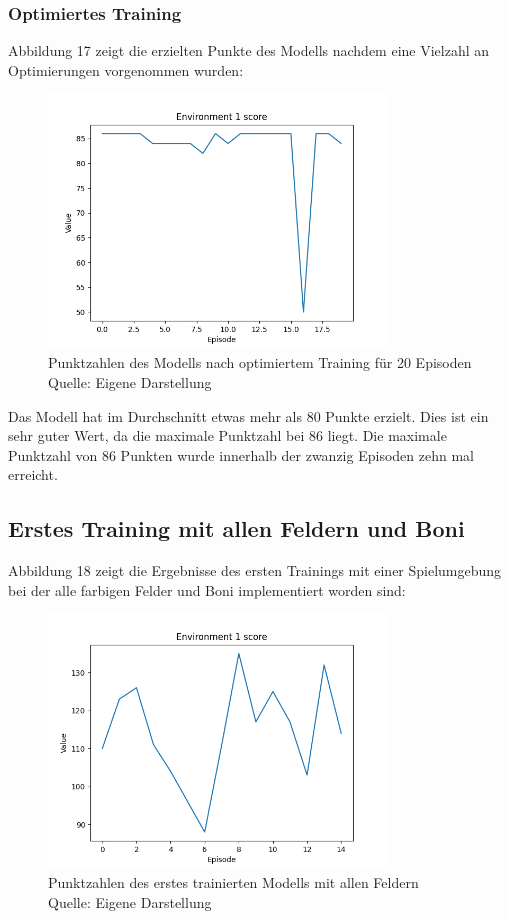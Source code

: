 \subsubsection{Optimiertes Training}
Abbildung 17 zeigt die erzielten Punkte des Modells nachdem eine Vielzahl an Optimierungen vorgenommen wurden:
\nopagebreak
\begin{figure}[H]
	\centering
	\includegraphics[width=0.8\textwidth]{Bilder/optimizetraining} 
	\caption[Punktzahlen des Modells nach optimiertem Training für 20 Episoden]{Punktzahlen des Modells nach optimiertem Training für 20 Episoden\\ Quelle: Eigene Darstellung}
\end{figure}

Das Modell hat im Durchschnitt etwas mehr als 80 Punkte erzielt. Dies ist ein sehr guter Wert, da die maximale Punktzahl bei 86 liegt. Die maximale Punktzahl von 86 Punkten wurde innerhalb der zwanzig Episoden zehn mal erreicht.
\subsection{Erstes Training mit allen Feldern und Boni}
Abbildung 18 zeigt die Ergebnisse des ersten Trainings mit einer Spielumgebung bei der alle farbigen Felder und Boni implementiert worden sind:
\nopagebreak
\begin{figure}[H]
	\centering
	\includegraphics[width=0.8\textwidth]{Bilder/firsttrainingwithallfields} 
	\caption[Punktzahlen des erstes trainierten Modells mit allen Feldern]{Punktzahlen des erstes trainierten Modells mit allen Feldern\\ Quelle: Eigene Darstellung}
\end{figure}


